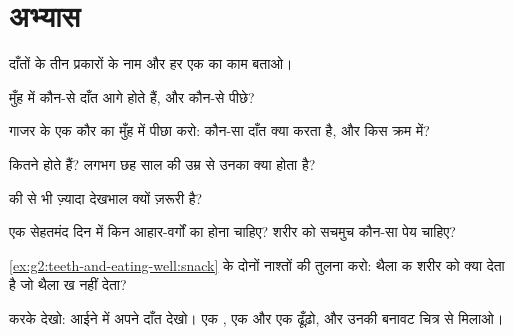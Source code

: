 \section{अभ्यास}

\begin{exercise}[$\star$]\label{exo:g2:teeth-and-eating-well:1}
दाँतों के तीन प्रकारों के नाम और हर एक का काम बताओ।
\end{exercise}

\begin{exercise}[$\star$]\label{exo:g2:teeth-and-eating-well:2}
मुँह में कौन-से दाँत आगे होते हैं, और कौन-से पीछे?
\end{exercise}

\begin{exercise}[$\star$]\label{exo:g2:teeth-and-eating-well:3}
गाजर के एक कौर का मुँह में पीछा करो: कौन-सा दाँत क्या करता है, और किस
क्रम में?
\end{exercise}

\begin{exercise}[$\star$]\label{exo:g2:teeth-and-eating-well:4}
 कितने होते हैं? लगभग छह साल की उम्र से उनका क्या होता है?
\end{exercise}

\begin{exercise}[$\star$]\label{exo:g2:teeth-and-eating-well:5}
 की  से भी ज़्यादा देखभाल क्यों ज़रूरी है?
\end{exercise}

\begin{exercise}[$\star$]\label{exo:g2:teeth-and-eating-well:6}
एक सेहतमंद दिन में किन आहार-वर्गों का होना चाहिए? शरीर को सचमुच
कौन-सा पेय चाहिए?
\end{exercise}

\begin{exercise}[$\star$]\label{exo:g2:teeth-and-eating-well:7}
\cref{ex:g2:teeth-and-eating-well:snack} के दोनों नाश्तों की तुलना
करो: थैला क शरीर को क्या देता है जो थैला ख नहीं देता?
\end{exercise}

\begin{exercise}[$\star$]\label{exo:g2:teeth-and-eating-well:8}
करके देखो: आईने में अपने दाँत देखो। एक , एक  और एक 
ढूँढ़ो, और उनकी बनावट चित्र से मिलाओ।
\end{exercise}

